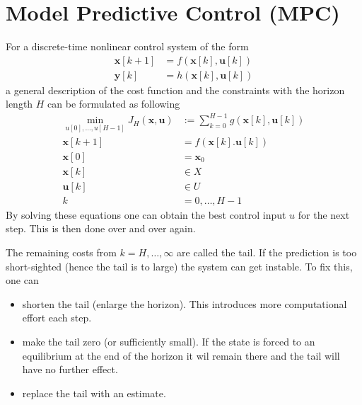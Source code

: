 \section{Model Predictive Control (MPC)}

For a discrete-time nonlinear control system of the form
\begin{align*}
    \mathbf{x}[k+1] & = f(\mathbf{x}[k], \mathbf{u}[k]) \\
    \mathbf{y}[k]   & = h(\mathbf{x}[k],\mathbf{u}[k])
\end{align*}
a general description of the cost function and the constraints with the horizon length $H$ can be formulated as following
\begin{align*}
    \min_{u[0], \ldots, u[H-1]} J_{H}(\mathbf{x,u}) & := \sum_{k=0}^{H-1}g(\mathbf{x}[k],\mathbf{u}[k]) \\
    \mathbf{x}[k+1]                                 & = f(\mathbf{x}[k]. \mathbf{u}[k])                 \\
    \mathbf{x}[0]                                   & = \mathbf{x}_0                                    \\
    \mathbf{x}[k]                                   & \in X                                             \\
    \mathbf{u}[k]                                   & \in U                                             \\
    k                                               & = 0,\ldots,H-1
\end{align*}
By solving these equations one can obtain the best control input $u$ for the next step. This is then done over and over again.

\newpar{}

The remaining costs from $k=H, \ldots, \infty$ are called the tail. If the prediction is too short-sighted (hence the tail is to large) the system can get instable. To fix this, one can
\begin{itemize}
    \item shorten the tail (enlarge the horizon). This introduces more computational effort each step.
    \item make the tail zero (or sufficiently small). If the state is forced to an equilibrium at the end of the horizon it wil remain there and the tail will have no further effect.
    \item replace the tail with an estimate.
\end{itemize}

